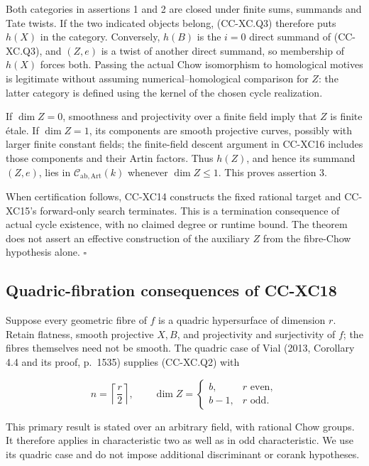 Both categories in assertions 1 and 2 are closed under finite sums,
summands and Tate twists. If the two indicated objects belong,
(CC-XC.Q3) therefore puts \(h(X)\) in the category. Conversely, \(h(B)\)
is the \(i=0\) direct summand of (CC-XC.Q3), and \((Z,e)\) is a twist of
another direct summand, so membership of \(h(X)\) forces both. Passing
the actual Chow isomorphism to homological motives is legitimate without
assuming numerical--homological comparison for \(Z\): the latter
category is defined using the kernel of the chosen cycle realization.

If \(\dim Z=0\), smoothness and projectivity over a finite field imply
that \(Z\) is finite étale. If \(\dim Z=1\), its components are smooth
projective curves, possibly with larger finite constant fields; the
finite-field descent argument in CC-XC16 includes those components and
their Artin factors. Thus \(h(Z)\), and hence its summand \((Z,e)\),
lies in \(\mathcal C_{\mathrm{ab,Art}}(k)\) whenever \(\dim Z\le1\).
This proves assertion 3.

When certification follows, CC-XC14 constructs the fixed rational target
and CC-XC15's forward-only search terminates. This is a termination
consequence of actual cycle existence, with no claimed degree or runtime
bound. The theorem does not assert an effective construction of the
auxiliary \(Z\) from the fibre-Chow hypothesis alone. \(\square\)

\subsection{Quadric-fibration consequences of
CC-XC18}\label{quadric-fibration-consequences-of-cc-xc18}

Suppose every geometric fibre of \(f\) is a quadric hypersurface of
dimension \(r\). Retain flatness, smooth projective \(X,B\), and
projectivity and surjectivity of \(f\); the fibres themselves need not
be smooth. The quadric case of Vial (2013, Corollary 4.4 and its proof,
p.~1535) supplies (CC-XC.Q2) with

\[
 n=\left\lceil\frac r2\right\rceil,\qquad
 \dim Z=
 \begin{cases}
 b,&r\text{ even},\\
 b-1,&r\text{ odd}.
 \end{cases}
 \tag{CC-XC.Q4}
\]

This primary result is stated over an arbitrary field, with rational
Chow groups. It therefore applies in characteristic two as well as in
odd characteristic. We use its quadric case and do not impose additional
discriminant or corank hypotheses.

